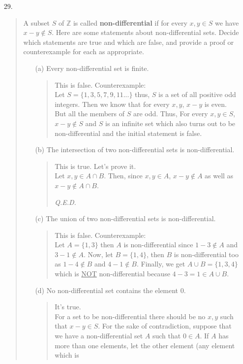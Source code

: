 \documentclass[12pt, a4paper]{article}                      %
\begin{document}
\begin{enumerate}
\item[29.]
\begin{quote}
A subset $S$ of $\mathbb{Z}$ is called \textbf{non-differential} if for every $x, y \in S$ we have
$x - y \notin S$. Here are some statements about non-differential sets. Decide which statements are
true and which are false, and provide a proof or counterexample for each as appropriate.
\begin{itemize}
\item[(a)]
Every non-differential set is finite.
\begin{quote}
This is false. Counterexample:\\
Let $S = \{1,3,5,7,9,11...\}$ thus, $S$ is a set of all positive odd integers.
Then we know that for every $x, y$, $x - y$ is even. But all the members of $S$
are odd. Thus, For every $x,y \in S$, $x - y \notin S$ and $S$ is an infinite set
which also turns out to be non-differential and the initial statement is false.
\end{quote}
\item[(b)]
The intersection of two non-differential sets is non-differential.
\begin{quote}
This is true. Let's prove it.\\
Let $x, y \in A \cap B$. Then, since $x, y \in A$, $x - y \notin A$ as well as $x - y \notin A \cap B$. 
\begin{flushright}
\textit{Q.E.D.}
\end{flushright}
\end{quote}
\item[(c)]
The union of two non-differential sets is non-differential.
\begin{quote}
This is false. Counterexample:\\
Let $A = \{1, 3\}$ then $A$ is non-differential since $1 - 3  \notin A$
and $3 - 1 \notin A$. Now, let $B = \{1, 4\}$, then $B$ is non-differential too
as $1 - 4 \notin B$ and $4 - 1 \notin B$. Finally, we get $A \cup B = \{1, 3, 4\}$
which is \underline{NOT} non-differential because $4 - 3 = 1 \in A \cup B$.
\end{quote}
\item[(d)]
No non-differential set contains the element 0.
\begin{quote}
It's true.\\
For a set to be non-differential there should be no $x, y$ such that $x - y \in S$.
For the sake of contradiction, suppose that we have a non-differential set $A$ such that
$0 \in A$. If $A$ has more than one elements, let the other element (any element which is

\end{quote}
\end{itemize}
\end{quote}
\end{enumerate}
\end{document}
